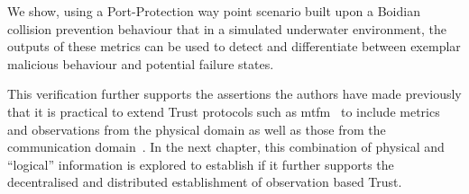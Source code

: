 We show, using a Port-Protection way point scenario built upon a Boidian collision prevention behaviour that in a simulated underwater environment, the outputs of these metrics can be used to detect and differentiate between exemplar malicious behaviour and potential failure states.

This verification further supports the assertions the authors have made previously that it is practical to extend Trust protocols such as \gls{mtfm}~\cite{Guo2012} to include metrics and observations from the physical domain as well as those from the communication domain~\cite{Bolster2014}.
In the next chapter, this combination of physical and ``logical'' information is explored to establish if it further supports the decentralised and distributed establishment of observation based Trust.

